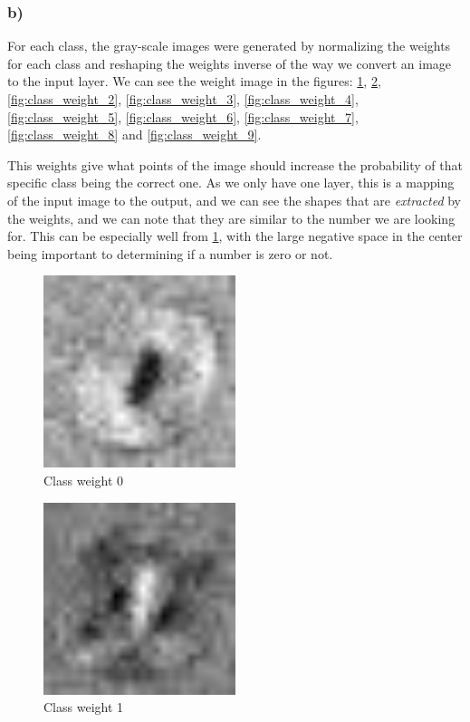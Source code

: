 \subsubsection*{b)}
For each class, the gray-scale images were generated by normalizing the weights for each class and reshaping the weights inverse of the way we convert an image to the input layer. We can see the weight image in the figures: \cref{fig:class_weight_0}, \cref{fig:class_weight_1}, \cref{fig:class_weight_2}, \cref{fig:class_weight_3}, \cref{fig:class_weight_4}, \cref{fig:class_weight_5}, \cref{fig:class_weight_6}, \cref{fig:class_weight_7}, \cref{fig:class_weight_8} and \cref{fig:class_weight_9}.  

This weights give what points of the image should increase the probability of that specific class being the correct one. As we only have one layer, this is a mapping of the input image to the output, and we can see the shapes that are \textit{extracted} by the weights, and we can note that they are similar to the number we are looking for. This can be especially well from \cref{fig:class_weight_0}, with the large negative space in the center being important to determining if a number is zero or not. 

\begin{figure}[]
    \centering
    \includegraphics[width=0.50\textwidth]{figures/weights/class_0_weight_image.jpg}
    \caption{Class weight 0}
    \label{fig:class_weight_0}
\end{figure}

\begin{figure}[]
    \centering
    \includegraphics[width=0.50\textwidth]{figures/weights/class_1_weight_image.jpg}
    \caption{Class weight 1}
    \label{fig:class_weight_1}
\end{figure}

